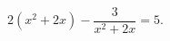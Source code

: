\begin{ex}[type=equation]
	\begin{condition}
		$2\left(x^2 + 2x \right) -\dfrac{3}{x^2 + 2x} = 5.$
	\end{condition}
\end{ex}